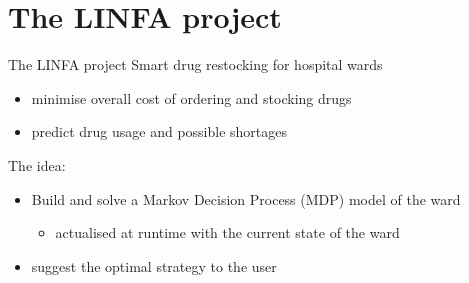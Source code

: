 
\section{The LINFA project}
  \begin{frame}{The LINFA project}
    Smart drug restocking for hospital wards
    \begin{itemize}
      \item minimise overall cost of ordering and stocking drugs
      \item predict drug usage and possible shortages
    \end{itemize}
    
    \vspace{2em}
    The idea:
    \begin{itemize}
      \item Build and solve a Markov Decision Process (MDP) model of the ward
      \begin{itemize}
        \item actualised at runtime with the current state of the ward
      \end{itemize}
      \item suggest the optimal strategy to the user
    \end{itemize}
  \end{frame}
  
